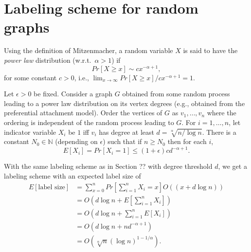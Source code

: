\documentclass[11pt]{article}
\begin{document}
\section{Labeling scheme for random graphs}
Using the definition of Mitzenmacher, a random variable $X$ is said to have the \emph{power law} distribution (w.r.t.~$\alpha > 1$) if
\[
  Pr[X\geq x] \sim cx^{-\alpha+1},
\]
for some constant $c > 0$, i.e., $\lim_{x\to\infty}Pr[X\geq x]/cx^{-\alpha+1} = 1$.

Let $\epsilon > 0$ be fixed. Consider a graph $G$ obtained from some random process leading to a power law distribution on its vertex degrees (e.g., obtained from the preferential attachment model). Order the vertices of $G$ as $v_1,\ldots,v_n$ where the ordering is independent of the random process leading to $G$. For $i=1,\ldots,n$, let indicator variable $X_i$ be $1$ iff $v_i$ has degree at least $d = \sqrt[\alpha]{n/\log n}$. There is a constant $N_0\in\mathbb N$ (depending on $\epsilon$) such that if $n\geq N_0$ then for each $i$,
\[
  E[X_i] = Pr[X_i = 1]\leq (1+\epsilon)cd^{-\alpha+1}.
\]

With the same labeling scheme as in Section ?? with degree threshold $d$, we get a labeling scheme with an expected label size of
\begin{align*}
  E[\mbox{label size}] & = \sum_{x=0}^n Pr\left[\sum_{i=1}^n X_i = x\right]O((x+d\log n))\\
                       & = O\left(d\log n + E\left[\sum_{i=1}^n X_i\right]\right)\\
                       & = O\left(d\log n + \sum_{i=1}^n E[X_i]\right)\\
                       & = O\left(d\log n + nd^{-\alpha+1}\right)\\
                       & = O\left(\sqrt[\alpha]n(\log n)^{1-1/\alpha}\right).
\end{align*}
\end{document}
